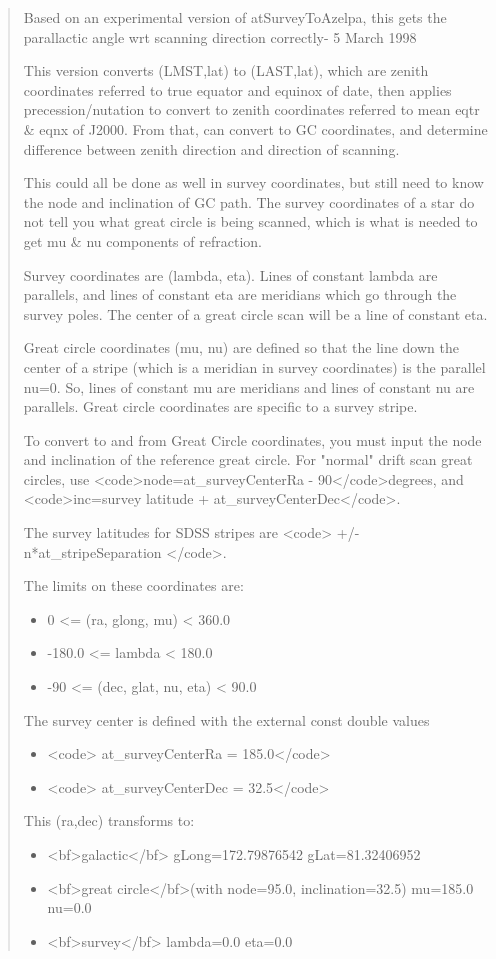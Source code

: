 \documentclass[11pt]{article}
\begin{document}
\begin{quote}
 Based on an experimental version of atSurveyToAzelpa, this gets the 
     parallactic angle wrt scanning direction  correctly- 5 March 1998

   This version converts (LMST,lat) to (LAST,lat), which are zenith
    coordinates referred to true equator and equinox of date, then 
    applies precession/nutation to convert to zenith coordinates referred 
    to mean eqtr \& eqnx of J2000.  From that, can convert to GC coordinates, 
    and determine difference between zenith direction and direction of 
    scanning.

    This could all be done as well in survey coordinates, but still need
    to know the node and inclination of GC path.  The survey coordinates
    of a star do not tell you what great circle is being scanned, which
    is what is needed to get mu \& nu components of refraction.

   Survey coordinates are (lambda, eta).  Lines of constant lambda are
   parallels, and lines of constant eta are meridians which go through
   the survey poles.  The center of a great circle scan will be a line
   of constant eta.

   Great circle coordinates (mu, nu) are defined so that the line down the
   center of a stripe (which is a meridian in survey coordinates) is the
   parallel nu=0.  So, lines of constant mu are meridians and lines of
   constant nu are parallels.  Great circle coordinates are specific to a
   survey stripe.

   To convert to and from Great Circle coordinates, you must input the
   node and inclination of the reference great circle.  For "normal" drift
   scan great circles, use <code>node=at\_surveyCenterRa - 90</code>degrees,
   and <code>inc=survey latitude + at\_surveyCenterDec</code>.

   The survey latitudes for SDSS stripes are <code> +/- n*at\_stripeSeparation
   </code>.


   The limits on these coordinates are:
\begin{itemize}
\item 0 <= (ra, glong, mu) < 360.0
\item -180.0 <= lambda < 180.0
\item -90 <= (dec, glat, nu, eta) < 90.0
\end{itemize}

   The survey center is defined with the external const double values
\begin{itemize}
\item <code> at\_surveyCenterRa = 185.0</code>
\item <code> at\_surveyCenterDec = 32.5</code>
\end{itemize}
   This (ra,dec) transforms to:
\begin{itemize}
\item <bf>galactic</bf> gLong=172.79876542 gLat=81.32406952
\item <bf>great circle</bf>(with node=95.0, inclination=32.5) mu=185.0 nu=0.0
\item <bf>survey</bf> lambda=0.0 eta=0.0
\end{itemize}
\end{quote}
\end{document}
